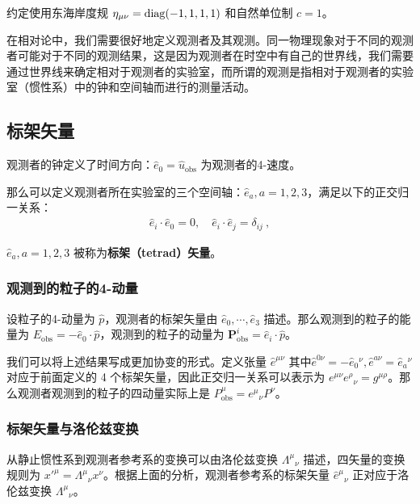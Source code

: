 

约定使用东海岸度规 $\eta_{\mu\nu}=\rm{diag}(-1,1,1,1)$ 和自然单位制 $c=1$。

在相对论中，我们需要很好地定义观测者及其观测。同一物理现象对于不同的观测者可能对于不同的观测结果，这是因为观测者在时空中有自己的世界线，我们需要通过世界线来确定相对于观测者的实验室，而所谓的观测是指相对于观测者的实验室（惯性系）中的钟和空间轴而进行的测量活动。\cite{陈斌广相}

\subsection{标架矢量}

观测者的钟定义了时间方向：$\hat{e}_0=\hat{u}_\text{obs}$ 为观测者的4-速度。

那么可以定义观测者所在实验室的三个空间轴：$\hat{e}_a,a=1,2,3$，满足以下的正交归一关系：
\begin{equation}
\begin{aligned}
\hat{e}_i\cdot \hat{e}_0=0,\quad \hat{e}_i\cdot \hat{e}_j=\delta_{ij}~,
\end{aligned}
\end{equation}

$\hat{e}_a,a=1,2,3$ 被称为\textbf{标架（tetrad）矢量}。
\subsubsection{观测到的粒子的4-动量}
设粒子的4-动量为 $\hat p$，观测者的标架矢量由 $\hat{e}_0,\cdots,\hat{e}_3$ 描述。那么观测到的粒子的能量为 $E_\text{obs}=-\hat{e}_0\cdot\hat{p}$，观测到的粒子的动量为 $\boldsymbol P_\text{obs}^i=\hat{e}_i\cdot\hat{p}$。

我们可以将上述结果写成更加协变的形式。定义张量 $\hat{e}^{\mu\nu}$ 其中$\hat{e}^{0\nu}=-\hat{e}_0{}^\nu,\hat{e}^{a\nu}=\hat{e}_a{}^\nu$ 对应于前面定义的 4 个标架矢量，因此正交归一关系可以表示为 $e^{\mu\nu} e^\rho{}_\nu=g^{\mu\rho}$。那么观测者观测到的粒子的四动量实际上是 $P^\mu_\text{obs}=e^\mu{}_\nu P^\nu$。
\subsubsection{标架矢量与洛伦兹变换}
从静止惯性系到观测者参考系的变换可以由洛伦兹变换 $\Lambda^\mu{}_\nu$ 描述，四矢量的变换规则为 ${x'}^{\mu}=\Lambda^\mu{}_\nu x^\nu$。根据上面的分析，观测者参考系的标架矢量 $\hat{e}^\mu{}_\nu$ 正对应于洛伦兹变换 $\Lambda^\mu{}_\nu$。
